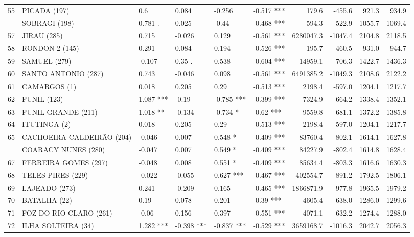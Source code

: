 \documentclass[12pt,oneside]{book}\usepackage[]{graphicx}\usepackage[]{color}
\newenvironment{knitrout}{}{} %
\theoremstyle{definition} %
\begin{document}
\begin{knitrout}
\begin{table}
{\begin{tabular}[t]{llllllrrrr}
\rowcolor{gray!6}  55 & PICADA (197) & 0.6 & 0.084 & -0.256 & -0.517 *** & 179.6 & -455.6 & 921.3 & 934.9\\
\addlinespace
56 & SOBRAGI (198) & 0.781 . & 0.025 & -0.44 & -0.468 *** & 594.3 & -522.9 & 1055.7 & 1069.4\\
\rowcolor{gray!6}  57 & JIRAU (285) & 0.715 & -0.026 & 0.129 & -0.561 *** & 6280047.3 & -1047.4 & 2104.8 & 2118.5\\
58 & RONDON 2 (145) & 0.291 & 0.084 & 0.194 & -0.526 *** & 195.7 & -460.5 & 931.0 & 944.7\\
\rowcolor{gray!6}  59 & SAMUEL (279) & -0.107 & 0.35 . & 0.538 & -0.604 *** & 14959.1 & -706.3 & 1422.7 & 1436.3\\
60 & SANTO ANTONIO (287) & 0.743 & -0.046 & 0.098 & -0.561 *** & 6491385.2 & -1049.3 & 2108.6 & 2122.2\\
\addlinespace
\rowcolor{gray!6}  61 & CAMARGOS (1) & 0.018 & 0.205 & 0.29 & -0.513 *** & 2198.4 & -597.0 & 1204.1 & 1217.7\\
62 & FUNIL (123) & 1.087 *** & -0.19 & -0.785 *** & -0.399 *** & 7324.9 & -664.2 & 1338.4 & 1352.1\\
\rowcolor{gray!6}  63 & FUNIL-GRANDE (211) & 1.018 ** & -0.134 & -0.734 * & -0.62 *** & 9559.8 & -681.1 & 1372.2 & 1385.8\\
64 & ITUTINGA (2) & 0.018 & 0.205 & 0.29 & -0.513 *** & 2198.4 & -597.0 & 1204.1 & 1217.7\\
\rowcolor{gray!6}  65 & CACHOEIRA CALDEIRÃO (204) & -0.046 & 0.007 & 0.548 * & -0.409 *** & 83760.4 & -802.1 & 1614.1 & 1627.8\\
\addlinespace
66 & COARACY NUNES (280) & -0.047 & 0.007 & 0.549 * & -0.409 *** & 84227.9 & -802.4 & 1614.8 & 1628.4\\
\rowcolor{gray!6}  67 & FERREIRA GOMES (297) & -0.048 & 0.008 & 0.551 * & -0.409 *** & 85634.4 & -803.3 & 1616.6 & 1630.3\\
68 & TELES PIRES (229) & -0.022 & -0.055 & 0.627 *** & -0.467 *** & 402554.7 & -891.2 & 1792.5 & 1806.1\\
\rowcolor{gray!6}  69 & LAJEADO (273) & 0.241 & -0.209 & 0.165 & -0.465 *** & 1866871.9 & -977.8 & 1965.5 & 1979.2\\
70 & BATALHA (22) & 0.19 & 0.078 & 0.201 & -0.39 *** & 4605.4 & -638.0 & 1286.0 & 1299.6\\
\addlinespace
\rowcolor{gray!6}  71 & FOZ DO RIO CLARO (261) & -0.06 & 0.156 & 0.397 & -0.551 *** & 4071.1 & -632.2 & 1274.4 & 1288.0\\
72 & ILHA SOLTEIRA (34) & 1.282 *** & -0.398 *** & -0.837 *** & -0.529 *** & 3659168.7 & -1016.3 & 2042.7 & 2056.3\\

\end{tabular}}
\end{table}
\end{knitrout}
\end{document}
